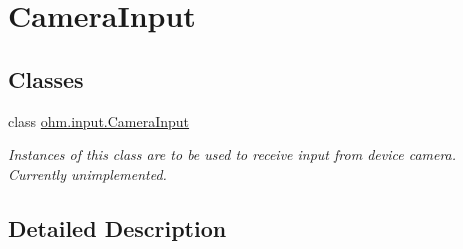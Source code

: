 \hypertarget{group___camera_input}{}\section{Camera\+Input}
\label{group___camera_input}
\subsection*{Classes}
\begin{DoxyCompactItemize}
\item 
class \hyperlink{classohm_1_1input_1_1_camera_input}{ohm.\+input.\+Camera\+Input}
\begin{DoxyCompactList}\small\item\em Instances of this class are to be used to receive input from device camera. Currently unimplemented. \end{DoxyCompactList}\end{DoxyCompactItemize}


\subsection{Detailed Description}
